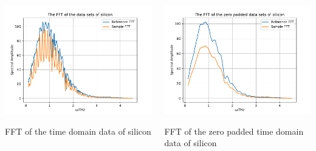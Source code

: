 \documentclass[aspectratio=1610, 9pt]{beamer}
\begin{document}
\begin{frame}
  \begin{center}
    \begin{columns}
      \begin{column}
        \includegraphics[width=\textwidth]{silicon/THz_FFT.pdf}
        \caption{FFT of the time domain data of silicon}
      \end{column}
      \begin{column}
        \includegraphics[width=\textwidth]{silicon/THz_FFT_zero.pdf}
        \caption{FFT of the zero padded time domain data of silicon}
      \end{column}
    \end{columns}
  \end{center}
\end{frame}
\end{document}
